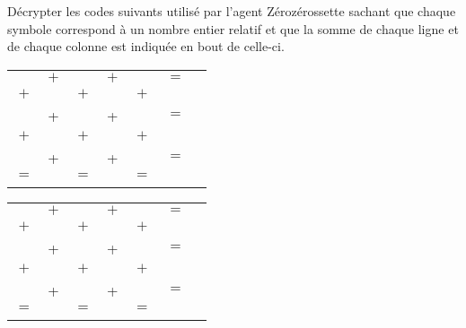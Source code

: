 \Recreation

\enigme[Décryptage]
   Décrypter les codes suivants utilisé par l'agent Zérozérossette sachant que chaque symbole correspond à un nombre entier relatif et que la somme de chaque ligne et de chaque colonne est indiquée en bout de celle-ci. \\
   \medskip
   \begin{center}
      {
      \begin{tabular}{*{7}{C{0.3}}}
         \Large{} & $+$ & \Large{} & $+$ & \Large{} & $=$ &  \\
         $+$ & & $+$ & & $+$ & & \\
         \Large{} & + & \Large{} & + & \Large{} & $=$ &  \\
         $+$ & & $+$ & & $+$ & & \\
         \Large{} & + & \Large{} & + & \Large{} & $=$ &  \\
         $=$ & & $=$ & & $=$ & & \\
          & &  & &  & & \\
      \end{tabular}
      \hspace*{4cm}
      \begin{tabular}{*{7}{C{0.3}}}
         \Large{} & $+$ & \Large{} & $+$ & \Large{} & $=$ &  \\
         $+$ & & $+$ & & $+$ & & \\
         \Large{} & + & \Large{} & + & \Large{} & $=$ &  \\
         $+$ & & $+$ & & $+$ & & \\
         \Large{} & + & \Large{} & + & \Large{} & $=$ &  \\
         $=$ & & $=$ & & $=$ & & \\
          & &  & &  & & \\
      \end{tabular}

      \ \\ [10mm]
      
}
\end{center}
